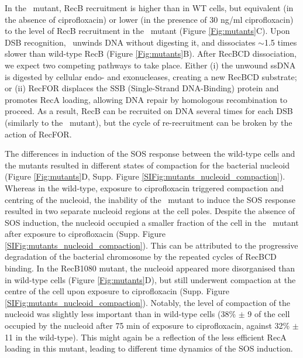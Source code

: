 In the \teneighty\ mutant, RecB recruitment is higher than in WT cells, but equivalent (in the absence of ciprofloxacin) or lower (in the presence of 30 ng/ml ciprofloxacin) to the level of RecB recruitment in the \dreca\ mutant (Figure \ref{Fig:mutants}C). Upon DSB recognition, \teneighty\ unwinds DNA without digesting it, and dissociates $\sim$1.5 times slower than wild-type RecB (Figure \ref{Fig:mutants}B). After RecBCD dissociation, we expect two competing pathways to take place. Either (i) the unwound ssDNA is digested by cellular endo- and exonucleases, creating a new RecBCD substrate; or (ii) RecFOR displaces the SSB (Single-Strand DNA-Binding) protein and promotes RecA loading, allowing DNA repair by homologous recombination to proceed\cite{Ivancic-Bace_2003}. As a result, RecB can be recruited on DNA several times for each DSB (similarly to the \dreca\ mutant), but the cycle of re-recruitment can be broken by the action of RecFOR.

The differences in induction of the SOS response between the wild-type cells and the mutants resulted in different states of compaction for the bacterial nucleoid (Figure \ref{Fig:mutants}D, Supp. Figure \ref{SIFig:mutants_nucleoid_compaction}). Whereas in the wild-type, exposure to ciprofloxacin triggered compaction and centring of the nucleoid, the inability of the \dreca\ mutant to induce the SOS response resulted in two separate nucleoid regions at the cell poles. Despite the absence of SOS induction, the nucleoid occupied a smaller fraction of the cell in the \dreca\ mutant after exposure to ciprofloxacin (Supp. Figure \ref{SIFig:mutants_nucleoid_compaction}). This can be attributed to the progressive degradation of the bacterial chromosome by the repeated cycles of RecBCD binding\cite{Capaldo1975,Skarstad1993}. In the RecB1080 mutant, the nucleoid appeared more disorganised than in wild-type cells (Figure \ref{Fig:mutants}D), but still underwent compaction at the centre of the cell upon exposure to ciprofloxacin (Supp. Figure \ref{SIFig:mutants_nucleoid_compaction}). Notably, the level of compaction of the nucleoid was slightly less important than in wild-type cells (38\% $\pm$ 9 of the cell occupied by the nucleoid after 75 min of exposure to ciprofloxacin, against 32\% $\pm$ 11 in the wild-type). This might again be a reflection of the less efficient RecA loading in this mutant, leading to different time dynamics of the SOS induction.

